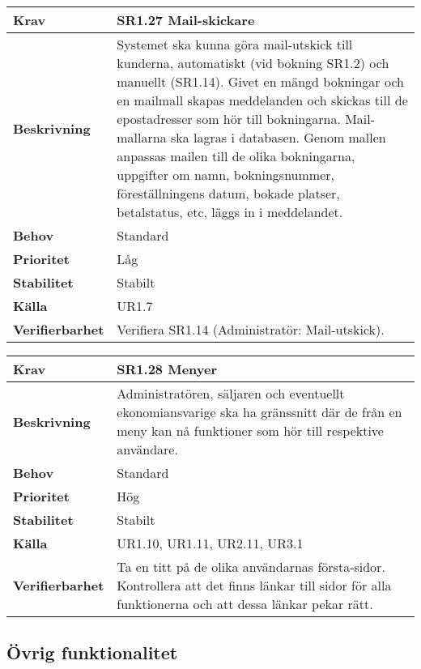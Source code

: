 \documentclass[a4paper, twoside, 11pt, titlepage]{article}
\begin{document}
	\begin{tabular} { p{2.6cm} p{12.5cm} }
		\hline
		\sffamily\textbf{Krav} & \sffamily\textbf{SR1.27 Mail-skickare } \\
		\hline
		\sffamily\textbf{Beskrivning} & Systemet ska kunna göra mail-utskick till kunderna, automatiskt (vid bokning SR1.2) och manuellt (SR1.14). Givet en mängd bokningar och en mailmall skapas meddelanden och skickas till de epostadresser som hör till bokningarna. Mail-mallarna ska lagras i databasen. Genom mallen anpassas mailen till de olika bokningarna, uppgifter om namn, bokningsnummer, föreställningens datum, bokade platser, betalstatus, etc, läggs in i meddelandet.  \\
		\hline
		\sffamily\textbf{Behov} & Standard  \\
		\hline
		\sffamily\textbf{Prioritet} & Låg  \\
		\hline
		\sffamily\textbf{Stabilitet} & Stabilt  \\
		\hline
		\sffamily\textbf{Källa} & UR1.7  \\
		\hline
		\sffamily\textbf{Verifierbarhet} & Verifiera SR1.14 (Administratör: Mail-utskick).  \\
		\hline
	\end{tabular}
	\vspace{6mm}

	\begin{tabular} { p{2.6cm} p{12.5cm} }
		\hline
		\sffamily\textbf{Krav} & \sffamily\textbf{SR1.28 Menyer } \\
		\hline
		\sffamily\textbf{Beskrivning} & Administratören, säljaren och eventuellt ekonomiansvarige ska ha gränssnitt där de från en meny kan nå funktioner som hör till respektive användare.  \\
		\hline
		\sffamily\textbf{Behov} & Standard  \\
		\hline
		\sffamily\textbf{Prioritet} & Hög  \\
		\hline
		\sffamily\textbf{Stabilitet} & Stabilt  \\
		\hline
		\sffamily\textbf{Källa} & UR1.10, UR1.11, UR2.11, UR3.1  \\
		\hline
		\sffamily\textbf{Verifierbarhet} & Ta en titt på de olika användarnas första-sidor. Kontrollera att det finns länkar till sidor för alla funktionerna och att dessa länkar pekar rätt.  \\
		\hline
	\end{tabular}


	\subsection{Övrig funktionalitet}
\end{document}
